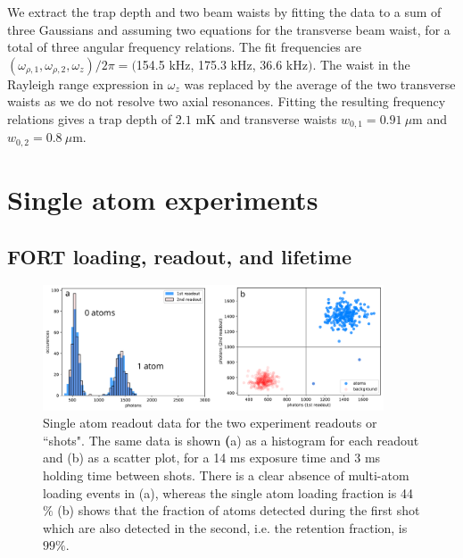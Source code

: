 We extract the trap depth and two beam waists by fitting the data to a sum of three Gaussians and assuming two equations for the transverse beam waist, for a total of three angular frequency relations. The fit frequencies are $(\omega_{\rho,1}, \omega_{\rho,2}, \omega_{z})/2\pi=($154.5 kHz, 175.3 kHz, 36.6 kHz$)$. The waist in the Rayleigh range expression in $\omega_z$ was replaced by the average of the two transverse waists as we do not resolve two axial resonances. Fitting the resulting frequency relations gives a trap depth of $2.1$ mK and transverse waists $w_{0,1}=0.91 ~\mu$m and $w_{0,2}=0.8 ~\mu$m.

\section{Single atom experiments}\label{sec:singleatomexperiments}

\subsection{FORT loading, readout, and lifetime}\label{sec:fort_loading}


\begin{figure}[!ht]
    \centering
    \includegraphics[width=0.9\textwidth]{Images/atom_histogram_and_scatterplot.pdf}
    \caption{Single atom readout data for the two experiment readouts or ``shots". The same data is shown \textbf({a}) as a histogram for each readout and (b) as a scatter plot, for a 14 ms exposure time and 3 ms holding time between shots. There is a clear absence of multi-atom loading events in (a), whereas the single atom loading fraction is 44$\%$ (b) shows that the fraction of atoms detected during the first shot which are also detected in the second, i.e. the retention fraction, is $99\%$.}
    \label{fig:atom_histogram}
\end{figure}

